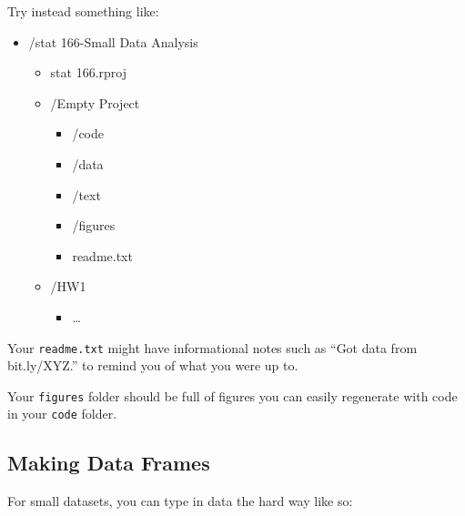 \documentclass[
  letterpaper,
  DIV=11,
  numbers=noendperiod]{scrreprt}
\providecommand{\tightlist}{%
  \setlength{\itemsep}{0pt}\setlength{\parskip}{0pt}}\usepackage{longtable,booktabs,array}
\begin{document}
Try instead something like:

\begin{itemize}
\tightlist
\item
  /stat 166-Small Data Analysis

  \begin{itemize}
  \tightlist
  \item
    stat 166.rproj
  \item
    /Empty Project

    \begin{itemize}
    \tightlist
    \item
      /code
    \item
      /data
    \item
      /text
    \item
      /figures
    \item
      readme.txt
    \end{itemize}
  \item
    /HW1

    \begin{itemize}
    \tightlist
    \item
      \ldots{}
    \end{itemize}
  \end{itemize}
\end{itemize}

Your \texttt{readme.txt} might have informational notes such as ``Got
data from bit.ly/XYZ.'' to remind you of what you were up to.

Your \texttt{figures} folder should be full of figures you can easily
regenerate with code in your \texttt{code} folder.

\hypertarget{making-data-frames}{%
\subsection{Making Data Frames}\label{making-data-frames}}

For small datasets, you can type in data the hard way like so:
\end{document}
